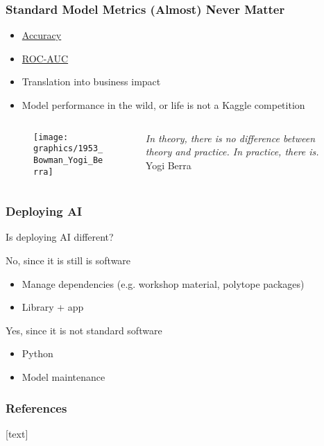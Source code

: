 \begin{frame}
\frametitle{Standard Model Metrics (Almost) Never Matter}

\begin{itemize}
    \item \href{https://scikit-learn.org/stable/modules/generated/sklearn.metrics.accuracy\_score.html}{Accuracy} \cite{aletras2016predicting, echr-2}
    \item \href{https://scikit-learn.org/stable/modules/generated/sklearn.metrics.roc\_auc\_score.html\#sklearn.metrics.roc\_auc\_score}{ROC-AUC}
    \item Translation into business impact
    \item Model performance in the wild, or life is not a Kaggle competition\newline
\end{itemize}

\begin{columns}
    \begin{column}{.3\textwidth}
\begin{figure}[ht]
    \texttt{[image: graphics/1953\_Bowman\_Yogi\_Berra]}
\end{figure}
\end{column}
\begin{column}{.3\textwidth}
    \emph{In theory, there is no difference between theory and practice. \newline
    In practice, there is.}\newline
    Yogi Berra
\end{column}
\begin{column}{.3\textwidth}
\end{column}
\end{columns}
\end{frame}


\begin{frame}
\frametitle{Deploying AI}

Is deploying AI different?\newline

No, since it is still is software
\begin{itemize}
\item Manage dependencies (e.g. workshop material, polytope packages)
\item Library + app
\end{itemize}

Yes, since it is not standard software
\begin{itemize}
    \item Python
    \item Model maintenance
\end{itemize}
\end{frame}


\begin{frame}[allowframebreaks]
    \frametitle{References}
    [text]
    
    
\end{frame}
